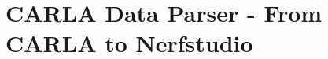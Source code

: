 \begin{comment}
The following algorithm outlines the steps for capturing synthetic data using the CARLA simulator. The code is written in Python and utilizes the CARLA library.

    
\begin{algorithmic}[1]
\Function{run\_carla\_session}{experiment\_settings}
    \State \textbf{create a directory} for the experiment and save experiment settings to a file
    \State \textbf{create a SLURM script} for the experiment
    \State \textbf{spawn an ego vehicle} and set up the traffic manager
    \State \textbf{create cameras} based on the specified camera rigs and rig file
    \State \textbf{create a TransformFile} to store the image and camera pose data
    \While{\textbf{stop criteria has not been met}}
        \State \textbf{tick the CARLA world}
        \State \textbf{get images} from all mounted cameras and stack them horizontally
        \State \textbf{show the image}
        \State \textbf{store the image and camera pose data} every n-th tick
        \State \textbf{update the distance traveled} using euclidean distance
    \EndWhile
    \State \textbf{export the TransformFile} and destroy the actors
\EndFunction
\end{algorithmic}

\end{comment}











\section{CARLA Data Parser - From CARLA to Nerfstudio} \label{sec:carla-to-nerfstudio}
\begin{comment}
Premise: Have collected data from CARLA.
Question: How do I get it from CARLA to Nerfstudio in a usable format?

\begin{itemize}
    \item Use the CARLA-simulator to find out which camera and vehicle settings work the best for capturing data for NeRFs.
    \item In order to do that I need to collect data from CARLA and convert it into a format that's usable by Nerfstudio.
\end{itemize}
\end{comment}

